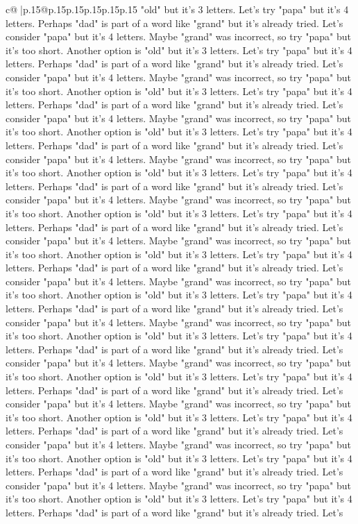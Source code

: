 \documentclass{article}
\begin{document}
{\begin{supertabular}{c@{$\;$}|p{.15\linewidth}@{}p{.15\linewidth}p{.15\linewidth}p{.15\linewidth}p{.15\linewidth}p{.15\linewidth}}
{{{"old" but it's 3 letters. Let's try "papa" but it's 4 letters. Perhaps "dad" is part of a word like "grand" but it's already tried. Let's consider "papa" but it's 4 letters. Maybe "grand" was incorrect, so try "papa" but it's too short. Another option is "old" but it's 3 letters. Let's try "papa" but it's 4 letters. Perhaps "dad" is part of a word like "grand" but it's already tried. Let's consider "papa" but it's 4 letters. Maybe "grand" was incorrect, so try "papa" but it's too short. Another option is "old" but it's 3 letters. Let's try "papa" but it's 4 letters. Perhaps "dad" is part of a word like "grand" but it's already tried. Let's consider "papa" but it's 4 letters. Maybe "grand" was incorrect, so try "papa" but it's too short. Another option is "old" but it's 3 letters. Let's try "papa" but it's 4 letters. Perhaps "dad" is part of a word like "grand" but it's already tried. Let's consider "papa" but it's 4 letters. Maybe "grand" was incorrect, so try "papa" but it's too short. Another option is "old" but it's 3 letters. Let's try "papa" but it's 4 letters. Perhaps "dad" is part of a word like "grand" but it's already tried. Let's consider "papa" but it's 4 letters. Maybe "grand" was incorrect, so try "papa" but it's too short. Another option is "old" but it's 3 letters. Let's try "papa" but it's 4 letters. Perhaps "dad" is part of a word like "grand" but it's already tried. Let's consider "papa" but it's 4 letters. Maybe "grand" was incorrect, so try "papa" but it's too short. Another option is "old" but it's 3 letters. Let's try "papa" but it's 4 letters. Perhaps "dad" is part of a word like "grand" but it's already tried. Let's consider "papa" but it's 4 letters. Maybe "grand" was incorrect, so try "papa" but it's too short. Another option is "old" but it's 3 letters. Let's try "papa" but it's 4 letters. Perhaps "dad" is part of a word like "grand" but it's already tried. Let's consider "papa" but it's 4 letters. Maybe "grand" was incorrect, so try "papa" but it's too short. Another option is "old" but it's 3 letters. Let's try "papa" but it's 4 letters. Perhaps "dad" is part of a word like "grand" but it's already tried. Let's consider "papa" but it's 4 letters. Maybe "grand" was incorrect, so try "papa" but it's too short. Another option is "old" but it's 3 letters. Let's try "papa" but it's 4 letters. Perhaps "dad" is part of a word like "grand" but it's already tried. Let's consider "papa" but it's 4 letters. Maybe "grand" was incorrect, so try "papa" but it's too short. Another option is "old" but it's 3 letters. Let's try "papa" but it's 4 letters. Perhaps "dad" is part of a word like "grand" but it's already tried. Let's consider "papa" but it's 4 letters. Maybe "grand" was incorrect, so try "papa" but it's too short. Another option is "old" but it's 3 letters. Let's try "papa" but it's 4 letters. Perhaps "dad" is part of a word like "grand" but it's already tried. Let's consider "papa" but it's 4 letters. Maybe "grand" was incorrect, so try "papa" but it's too short. Another option is "old" but it's 3 letters. Let's try "papa" but it's 4 letters. Perhaps "dad" is part of a word like "grand" but it's already tried. Let's }}}
\end{supertabular}}
\end{document}
